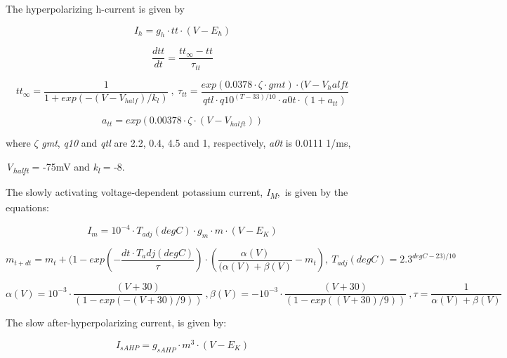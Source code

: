 \documentclass[12pt]{article}
\begin{document}
The hyperpolarizing h-current is given by

\begin{equation}
I_h=g_h\cdot tt \cdot (V-E_h)
\end{equation}

\begin{equation}
\frac{dtt}{dt}=\frac{tt_{\infty}-tt}{\tau_{tt}}
\end{equation}

\begin{equation}
tt_{\infty }=\frac {1}{1+exp(-(V-V_{half})/k_l)} \ , \ 
\tau_{tt}=\frac{exp( 0.0378\cdot \zeta \cdot gmt)\cdot
	(V-V_halft}{qtl \cdot q10^{(T-33)/10}\cdot a0t \cdot
	(1+a_{tt})}
\end{equation}

\begin{equation}
a_{tt}=exp( 0.00378\cdot \zeta\cdot (V-V_{halft}))
\end{equation}

{where } $\zeta$ {\textit{gmt}}{, }{\textit{q10}}{ and }{\textit{qtl}}{ are 2.2, 0.4, 4.5 and 1,
	respectively, }{\textit{a0t}}{ is 0.0111 1/ms,}



{\textit{V}}{\textit{\textsubscript{halft}}}{ = -75mV and }{\textit{k}}{\textit{\textsubscript{l}}}{ = -8.}



The slowly activating voltage‑dependent potassium current, \textit{I}\textit{\textsubscript{M}},~is given by the
equations:


\begin{equation}
I_m=10^{-4}\cdot T_{adj}(degC)\cdot g_m\cdot m\cdot
(V-E_K)
\end{equation}



\begin{equation}
m_{t+dt}=m_t+(1-exp(-\frac{dt \cdot T_adj(degC)}{\tau})\cdot (\frac{\alpha(V)}{(\alpha(V)+\beta(V)}-m_t), \ 
T_{adj}(degC)=2.3^{degC-23)/10}
\end{equation}

\begin{equation}
\alpha(V) = 10^{-3}\cdot \frac{(V+30)}{(1-exp(-(V+30)/9))} \ ,         \beta(V) = -10^{-3}\cdot \frac{(V+30)}{(1-exp((V+30)/9))} \ , 
\tau =\frac {1}{\alpha(V)+\beta(V)}
\end{equation}


The slow after-hyperpolarizing current, is given by:


\begin{equation}
I_{sAHP}= g_{sAHP}\cdot m^3\cdot
(V-E_K)
\end{equation}
\end{document}
